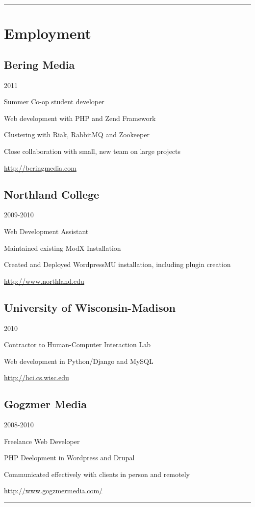 \documentclass[letterpaper,11pt,notitlepage]{article}
\begin{document}

\rule[1mm]{\linewidth}{0.25mm}
\section{Employment}
    \subsection{Bering Media}{2011}
        \begin{employment}
            \item Summer Co-op student developer
            \item Web development with PHP and Zend Framework
            \item Clustering with Riak, RabbitMQ and
            Zookeeper
            \item Close collaboration with small, new team on large  projects
            \item \url{http://beringmedia.com}
        \end{employment}
    \subsection{Northland College}{2009-2010}
        \begin{employment}
            \item Web Development Assistant 
            \item Maintained existing ModX Installation
            \item Created and Deployed WordpressMU installation, including plugin creation
            \item \url{http://www.northland.edu}
        \end{employment}
    \subsection{University of Wisconsin-Madison}{2010}
        \begin{employment}
            \item Contractor to Human-Computer Interaction Lab
            \item Web development in Python/Django and MySQL
            \item \url{http://hci.cs.wisc.edu}
        \end{employment}
    \subsection{Gogzmer Media}{2008-2010}
        \begin{employment}
            \item Freelance Web Developer
            \item PHP Deelopment in Wordpress and Drupal
            \item Communicated effectively with clients in person and remotely
            \item \url{http://www.gogzmermedia.com/}
        \end{employment}
\rule[1mm]{\linewidth}{0.25mm}
\end{document}
